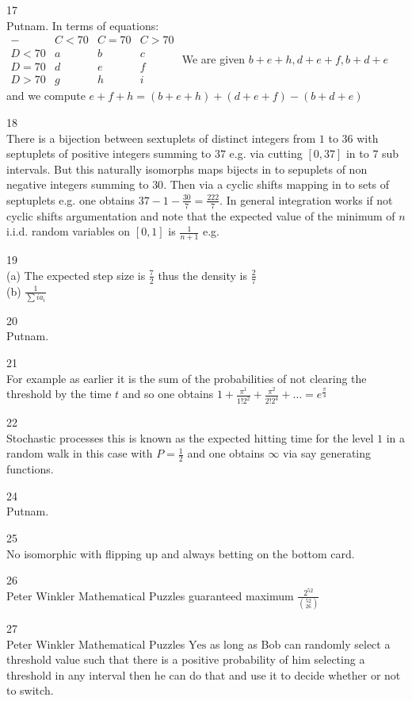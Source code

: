 17 \\
Putnam. In terms of equations: \\
$
\begin{matrix}
- & C<70 & C=70 & C>70 \\
D<70 & a & b & c \\
D=70 & d & e & f \\
D>70 & g & h & i
\end{matrix}
$
We are given $b+e+h, d+e+f, b+d+e$ and we compute $e+f+h=(b+e+h)+(d+e+f)-(b+d+e)$

18 \\
There is a bijection between sextuplets of distinct integers from $1$ to $36$ with septuplets of positive integers summing to $37$ e.g. via cutting $[0,37]$ in to $7$ sub intervals. But this naturally isomorphs maps bijects in to sepuplets of non negative integers summing to $30$. Then via a cyclic shifts mapping in to sets of septuplets e.g. one obtains $37-1-\frac{30}{7}=\boxed{\frac{222}{7}}$. In general integration works if not cyclic shifts argumentation and note that the expected value of the minimum of $n$ i.i.d. random variables on $[0,1]$ is $\frac{1}{n+1}$ e.g.

19 \\
(a) The expected step size is $\frac{7}{2}$ thus the density is $\boxed{\frac{2}{7}}$ \\
(b) $\boxed{\frac{1}{\sum ia_i}}$

20 \\
Putnam.

21 \\
For example as earlier it is the sum of the probabilities of not clearing the threshold by the time $t$ and so one obtains $1+\frac{\pi^1}{1!2^2}+\frac{\pi^2}{2!2^4}+\dots=\boxed{e^{\frac{\pi}{4}}}$

22 \\
Stochastic processes this is known as the expected hitting time for the level $1$ in a random walk in this case with $P=\frac{1}{2}$ and one obtains $\boxed{\infty}$ via say generating functions.

24 \\
Putnam.

25 \\
$\boxed{\text{No}}$ isomorphic with flipping up and always betting on the bottom card.

26 \\
Peter Winkler Mathematical Puzzles guaranteed maximum $\frac{2^{52}}{\binom{52}{26}}$

27 \\
Peter Winkler Mathematical Puzzles $\boxed{\text{Yes}}$ as long as Bob can randomly select a threshold value such that there is a positive probability of him selecting a threshold in any interval then he can do that and use it to decide whether or not to switch.

